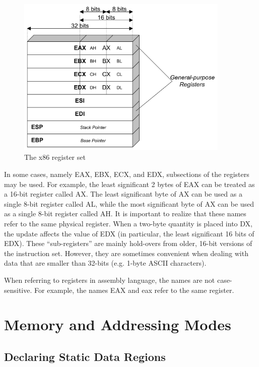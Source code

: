 \begin{figure}[h]
\begin{center}
\includegraphics[width=4in]{x86/x86-register-diagram.pdf}
\end{center}
\caption{The x86 register set}
\label{x86-register-diagram.fig}
\end{figure}

In some cases, namely EAX, EBX, ECX, and EDX, subsections of the
registers may be used.  For example, the least significant 2 bytes of
EAX can be treated as a 16-bit register called AX.  The least
significant byte of AX can be used as a single 8-bit register called
AL, while the most significant byte of AX can be used as a single
8-bit register called AH. It is important to realize that these names
refer to the same physical register. When a two-byte quantity is
placed into DX, the update affects the value of EDX (in particular,
the least significant 16 bits of EDX). These ``sub-registers''
are mainly hold-overs from older, 16-bit versions of the instruction
set. However, they are sometimes convenient when dealing with data
that are smaller than 32-bits (e.g. 1-byte ASCII characters).

When referring to registers in assembly language, the names are not
case-sensitive. For example, the names EAX and eax refer to the same
register.

\section{Memory and Addressing Modes}

\subsection{Declaring Static Data Regions}


